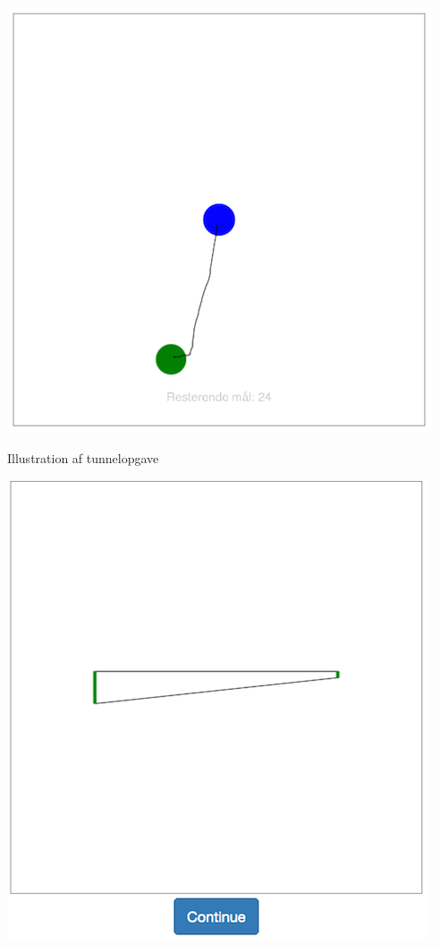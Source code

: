 \begin{minipage}[t]{.4\textwidth}
\centering
\vspace{0pt}
\includegraphics[scale=0.5]{billeder/pegeopgave1.png}
\label{fig:pegeopgave}
\caption{Illustration af tunnelopgave}
\includegraphics[scale=0.5]{billeder/tunnelopgave.png}

\end{minipage}
